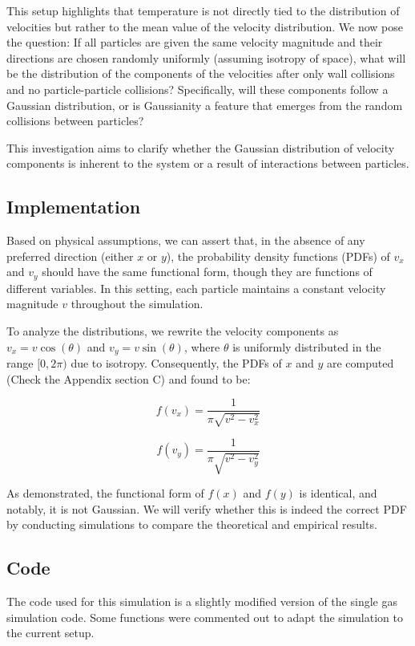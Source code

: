 \documentclass{article}
\begin{document}
This setup highlights that temperature is not directly tied to the distribution of velocities but rather to the mean value of the velocity distribution. We now pose the question: If all particles are given the same velocity magnitude and their directions are chosen randomly uniformly (assuming isotropy of space), what will be the distribution of the components of the velocities after only wall collisions and no particle-particle collisions? Specifically, will these components follow a Gaussian distribution, or is Gaussianity a feature that emerges from the random collisions between particles?

This investigation aims to clarify whether the Gaussian distribution of velocity components is inherent to the system or a result of interactions between particles.
\subsection{Implementation}

Based on physical assumptions, we can assert that, in the absence of any preferred direction (either \(x\) or \(y\)), the probability density functions (PDFs) of \(v_x\) and \(v_y\) should have the same functional form, though they are functions of different variables. In this setting, each particle maintains a constant velocity magnitude \(v\) throughout the simulation.

To analyze the distributions, we rewrite the velocity components as \(v_x = v \cos(\theta)\) and \(v_y = v \sin(\theta)\), where \(\theta\) is uniformly distributed in the range \([0, 2\pi)\) due to isotropy. Consequently, the PDFs of \(x\) and \(y\) are computed (Check the Appendix section C) and found to be:

\[
f(v_x) = \frac{1}{\pi \sqrt{v^2 - v_x^2}}
\]

\[
f(v_y) = \frac{1}{\pi \sqrt{v^2 - v_y^2}}
\]

As demonstrated, the functional form of \(f(x)\) and \(f(y)\) is identical, and notably, it is not Gaussian. We will verify whether this is indeed the correct PDF by conducting simulations to compare the theoretical and empirical results.


\subsection{Code}
The code used for this simulation is a slightly modified version of the single gas simulation code. Some functions were commented out to adapt the simulation to the current setup. 
\end{document}

